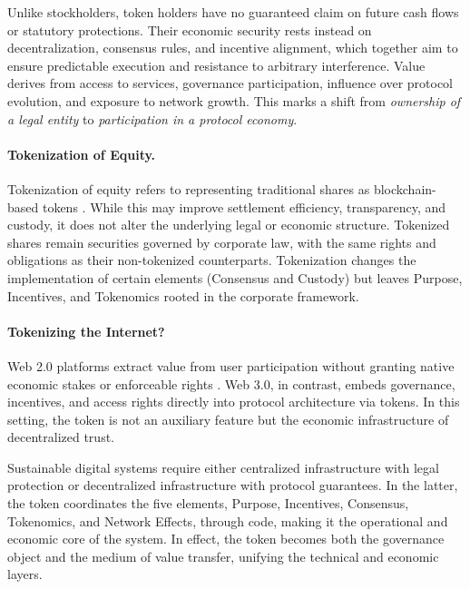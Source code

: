 \documentclass[12pt]{article}
\begin{document}
Unlike stockholders, token holders have no guaranteed claim on future cash flows or statutory protections. Their economic security rests instead on decentralization, consensus rules, and incentive alignment, which together aim to ensure predictable execution and resistance to arbitrary interference. Value derives from access to services, governance participation, influence over protocol evolution, and exposure to network growth. This marks a shift from \textit{ownership of a legal entity} to \textit{participation in a protocol economy}.

\paragraph{Tokenization of Equity.}
Tokenization of equity refers to representing traditional shares as blockchain-based tokens \citep{benedetti2021tokenized}. While this may improve settlement efficiency, transparency, and custody, it does not alter the underlying legal or economic structure. Tokenized shares remain securities governed by corporate law, with the same rights and obligations as their non-tokenized counterparts. Tokenization changes the implementation of certain elements (Consensus and Custody) but leaves Purpose, Incentives, and Tokenomics rooted in the corporate framework.

\paragraph{Tokenizing the Internet?}
Web 2.0 platforms extract value from user participation without granting native economic stakes or enforceable rights \citep{hassan2025web3}. Web 3.0, in contrast, embeds governance, incentives, and access rights directly into protocol architecture via tokens. In this setting, the token is not an auxiliary feature but the economic infrastructure of decentralized trust.

\begin{tcolorbox}[title=\textbf{Centralization vs. Decentralization}]
Sustainable digital systems require either centralized infrastructure with legal protection or decentralized infrastructure with protocol guarantees. In the latter, the token coordinates the five elements, Purpose, Incentives, Consensus, Tokenomics, and Network Effects, through code, making it the operational and economic core of the system. In effect, the token becomes both the governance object and the medium of value transfer, unifying the technical and economic layers.
\end{tcolorbox}
\end{document}
